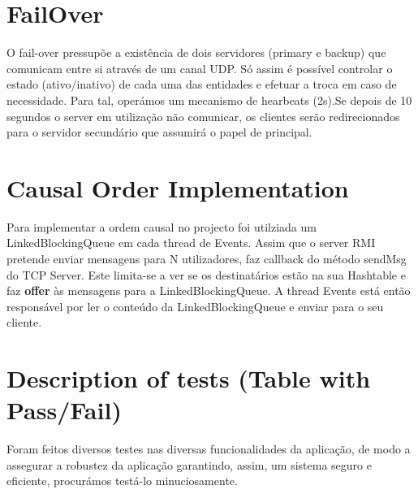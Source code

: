 \documentclass[12pt]{article} %
\begin{document}
\pagebreak

\section{FailOver}
\label{sec:failover}
O fail-over pressupõe a existência de dois servidores (primary e backup) que comunicam entre si através de um canal UDP. Só assim é possível controlar o estado (ativo/inativo) de cada uma das entidades e efetuar a troca em caso de necessidade. Para tal, operámos um mecanismo de hearbeats (2s).Se depois de 10 segundos o server em utilização não comunicar, os clientes serão redirecionados para o servidor secundário que assumirá o papel de principal.

\pagebreak
\section{Causal Order Implementation}
\label{sec:causal}

Para implementar a ordem causal no projecto foi utilziada um LinkedBlockingQueue em cada thread de Events. Assim que o server RMI pretende enviar mensagens para N utilizadores, faz callback do método sendMsg do TCP Server. Este limita-se a ver se os destinatários estão na sua Hashtable e faz \textbf{offer} às mensagens para a LinkedBlockingQueue. A thread Events está então responsável por ler o conteúdo da LinkedBlockingQueue e enviar para o seu cliente.

\pagebreak
\section{Description of tests (Table with Pass/Fail)} %
\label{sec:Tests}
Foram feitos diversos testes nas diversas funcionalidades da aplicação, de modo a assegurar a robustez da aplicação garantindo, assim, um sistema seguro e eficiente, procurámos testá-lo minuciosamente.

\end{document}
